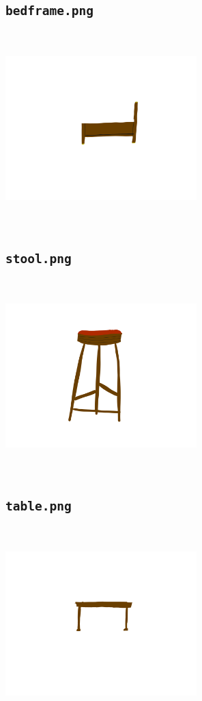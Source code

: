 \documentclass[american,extrafontsizes,12pt,portrait,letterpaper,oneside,onecolumn,final]{memoir}
\begin{document}
\subsection{\texorpdfstring{\texttt{bedframe.png}}{\texttt{bedframe.png}}}

\includegraphics[keepaspectratio=true,width=20em,height=20em]{product_Images/bedframe.png}

\subsection{\texorpdfstring{\texttt{stool.png}}{\texttt{stool.png}}}

\includegraphics[keepaspectratio=true,width=20em,height=20em]{product_Images/stool.png}

\subsection{\texorpdfstring{\texttt{table.png}}{\texttt{table.png}}}

\includegraphics[keepaspectratio=true,width=20em,height=20em]{product_Images/table.png}
\end{document}
